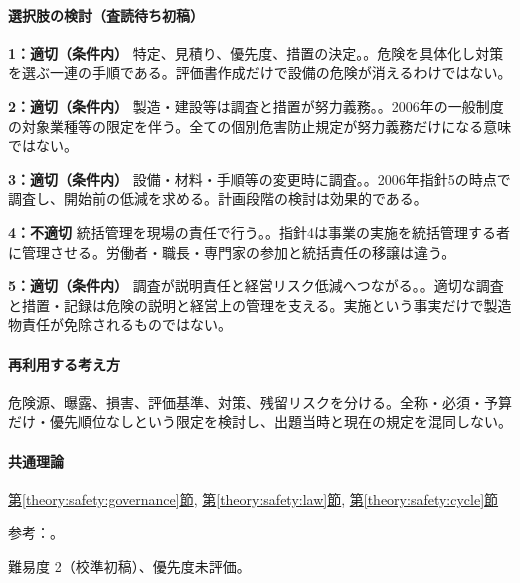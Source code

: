 \paragraph{選択肢の検討（査読待ち初稿）}\mbox{}\par

\noindent\textbf{1：適切（条件内）} 特定、見積り、優先度、措置の決定。。危険を具体化し対策を選ぶ一連の手順である。評価書作成だけで設備の危険が消えるわけではない。\par

\noindent\textbf{2：適切（条件内）} 製造・建設等は調査と措置が努力義務。。2006年の一般制度の対象業種等の限定を伴う。全ての個別危害防止規定が努力義務だけになる意味ではない。\par

\noindent\textbf{3：適切（条件内）} 設備・材料・手順等の変更時に調査。。2006年指針5の時点で調査し、開始前の低減を求める。計画段階の検討は効果的である。\par

\noindent\textbf{4：不適切} 統括管理を現場の責任で行う。。指針4は事業の実施を統括管理する者に管理させる。労働者・職長・専門家の参加と統括責任の移譲は違う。\par

\noindent\textbf{5：適切（条件内）} 調査が説明責任と経営リスク低減へつながる。。適切な調査と措置・記録は危険の説明と経営上の管理を支える。実施という事実だけで製造物責任が免除されるものではない。\par

\paragraph{再利用する考え方} 危険源、曝露、損害、評価基準、対策、残留リスクを分ける。全称・必須・予算だけ・優先順位なしという限定を検討し、出題当時と現在の規定を混同しない。

\paragraph{共通理論} \hyperref[theory:safety:governance]{第\ref*{theory:safety:governance}節}, \hyperref[theory:safety:law]{第\ref*{theory:safety:law}節}, \hyperref[theory:safety:cycle]{第\ref*{theory:safety:cycle}節}

\par 参考：\cite{saf_ra2006,saf_ra_effects}。

\par 難易度 2（校準初稿）、優先度未評価。

